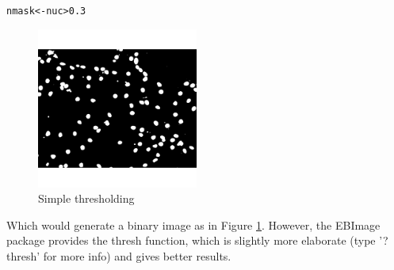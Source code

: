 \documentclass{article}\usepackage[]{graphicx}\usepackage[]{color}
\makeatletter
\newcommand{\hlnum}[1]{\textcolor[rgb]{0.686,0.059,0.569}{#1}}%
\newcommand{\hlopt}[1]{\textcolor[rgb]{0,0,0}{#1}}%
\newcommand{\hlstd}[1]{\textcolor[rgb]{0.345,0.345,0.345}{#1}}%
\newcommand{\hlkwb}[1]{\textcolor[rgb]{0.69,0.353,0.396}{#1}}%
\newenvironment{kframe}{%
 \def\at@end@of@kframe{}%
 \ifinner\ifhmode%
  \def\at@end@of@kframe{\end{minipage}}%
  \begin{minipage}{\columnwidth}%
 \fi\fi%
 \def\FrameCommand##1{\hskip\@totalleftmargin \hskip-\fboxsep
 \colorbox{shadecolor}{##1}\hskip-\fboxsep
     \hskip-\linewidth \hskip-\@totalleftmargin \hskip\columnwidth}%
 \MakeFramed {\advance\hsize-\width
   \@totalleftmargin\z@ \linewidth\hsize
   \@setminipage}}%
 {\par\unskip\endMakeFramed%
 \at@end@of@kframe}
\newenvironment{knitrout}{}{} %
\makeatother
\begin{document}
\begin{knitrout}
\color{fgcolor}\begin{kframe}
\begin{alltt}
\hlstd{nmask} \hlkwb{<-} \hlstd{nuc} \hlopt{>} \hlnum{0.3}
\end{alltt}
\end{kframe}\begin{figure}

{\centering \includegraphics[width=200px]{knit_figure/figsimp_thr-1} 

}

\caption[Simple thresholding]{Simple thresholding\label{fig:simp.thr}}
\end{figure}


\end{knitrout}
Which would generate a binary image as in Figure \ref{fig:simp.thr}.
However, the EBImage package provides the thresh function, which is slightly more elaborate (type '?thresh' for more info) and gives better results.
\end{document}
